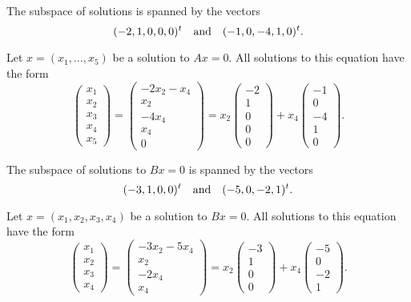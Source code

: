 \documentclass{ximera}
\begin{document}
\ans The subspace of solutions is spanned by the vectors
\[
(-2,1,0,0,0)^t \quad\mbox{and}\quad (-1,0,-4,1,0)^t.
\]

\soln Let $x = (x_1,\dots ,x_5)$ be a solution to $Ax = 0$.  All
solutions to this equation have the form
\[
\left(\begin{array}{r} x_1 \\ x_2 \\ x_3 \\ x_4 \\ x_5
\end{array}\right) = \left(\begin{array}{c} -2x_2 - x_4 \\ x_2 \\
-4x_4 \\ x_4 \\ 0 \end{array}\right) = x_2\left(\begin{array}{r}
-2 \\ 1 \\ 0 \\ 0 \\ 0 \end{array}\right) +
x_4\left(\begin{array}{r} -1 \\ 0 \\ -4 \\ 1 \\ 0
\end{array}\right).
\]

\ans The subspace of solutions to $Bx = 0$ is spanned by the vectors
\[
(-3,1,0,0)^t \quad\mbox{and}\quad (-5,0,-2,1)^t.
\]

\soln Let $x = (x_1,x_2,x_3,x_4)$ be a solution to $Bx = 0$.  All
solutions to this equation have the form
\[
\left(\begin{array}{r} x_1 \\ x_2 \\ x_3 \\ x_4 \end{array}\right)
= \left(\begin{array}{c} -3x_2 - 5x_4 \\ x_2 \\ -2x_4 \\ x_4
\end{array}\right) = x_2\left(\begin{array}{r} -3 \\ 1 \\ 0 \\ 0
\end{array}\right) + x_4\left(\begin{array}{r} -5 \\ 0 \\ -2 \\ 1
\end{array}\right).
\]
\end{document}
